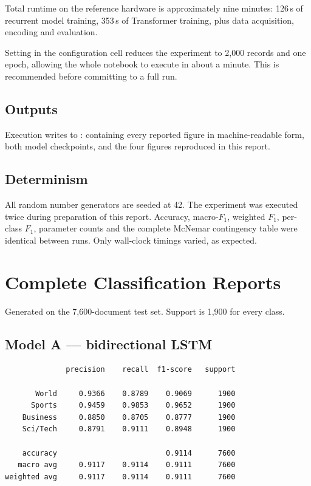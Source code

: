 Total runtime on the reference hardware is approximately nine minutes: 126\,s of recurrent model
training, 353\,s of Transformer training, plus data acquisition, encoding and evaluation.

Setting  in the configuration cell reduces the experiment to 2{,}000
records and one epoch, allowing the whole notebook to execute in about a minute. This is
recommended before committing to a full run.

\section{Outputs}

Execution writes to :  containing every reported figure in
machine-readable form, both model checkpoints, and the four figures reproduced in this report.

\section{Determinism}

All random number generators are seeded at 42. The experiment was executed twice during
preparation of this report. Accuracy, macro-$F_1$, weighted $F_1$,
per-class $F_1$, parameter counts and the complete McNemar contingency table were
identical between runs. Only wall-clock timings varied, as expected.

\chapter{Complete Classification Reports}
\label{app:reports}

Generated on the 7{,}600-document test set. Support is 1{,}900 for every class.

\section{Model A --- bidirectional LSTM}

{\small
\begin{verbatim}
              precision    recall  f1-score   support

       World     0.9366    0.8789    0.9069      1900
      Sports     0.9459    0.9853    0.9652      1900
    Business     0.8850    0.8705    0.8777      1900
    Sci/Tech     0.8791    0.9111    0.8948      1900

    accuracy                         0.9114      7600
   macro avg     0.9117    0.9114    0.9111      7600
weighted avg     0.9117    0.9114    0.9111      7600
\end{verbatim}}


